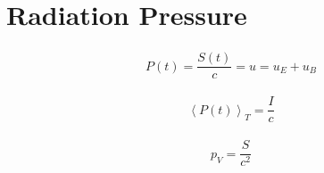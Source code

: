 \section{Radiation Pressure}

\begin{equation}
  \begin{aligned}
    P(t) = \dfrac{S(t)}{c} = u = u_E + u_B
  \end{aligned}
\end{equation}

\begin{equation}
  \begin{aligned}
    \left< P(t) \right>_T = \dfrac{I}{c} 
  \end{aligned}
\end{equation}

\begin{equation}
  \begin{aligned}
    p_V = \dfrac{S}{c^{2}} 
  \end{aligned}
\end{equation} 

